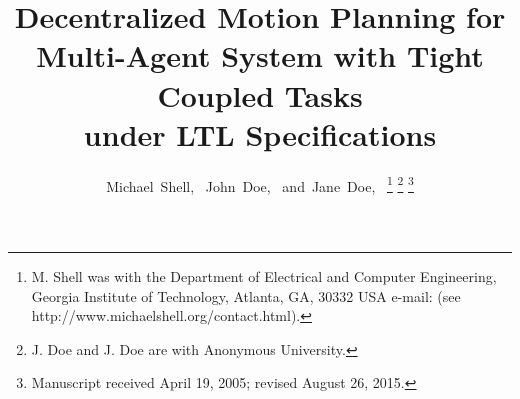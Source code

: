 \documentclass[journal]{IEEEtran}
\begin{document}
%
\title{Decentralized Motion Planning for Multi-Agent System with Tight Coupled Tasks \\under LTL Specifications}
%
%
%

\author{Michael~Shell,~
        John~Doe,~
        and~Jane~Doe,~%
\thanks{M. Shell was with the Department
of Electrical and Computer Engineering, Georgia Institute of Technology, Atlanta,
GA, 30332 USA e-mail: (see http://www.michaelshell.org/contact.html).}%
\thanks{J. Doe and J. Doe are with Anonymous University.}%
\thanks{Manuscript received April 19, 2005; revised August 26, 2015.}}

%
%
\end{document}
